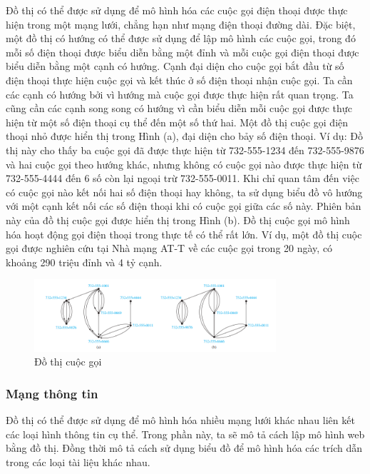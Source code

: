 Đồ thị có thể được sử dụng để mô hình hóa các cuộc gọi điện thoại được thực hiện trong một mạng lưới, chẳng hạn như mạng điện thoại đường dài. Đặc biệt, một đồ thị có hướng có thể được sử dụng để lập mô hình các cuộc gọi, trong đó mỗi số điện thoại được biểu diễn bằng một đỉnh và mỗi cuộc gọi điện thoại được biểu diễn bằng một cạnh có hướng. Cạnh đại diện cho cuộc gọi bắt đầu từ số điện thoại thực hiện cuộc gọi và kết thúc ở số điện thoại nhận cuộc gọi. Ta cần các cạnh có hướng bởi vì hướng mà cuộc gọi được thực hiện rất quan trọng. Ta cũng cần các cạnh song song có hướng vì cần biểu diễn mỗi cuộc gọi được thực hiện từ một số điện thoại cụ thể đến một số thứ hai.
Một đồ thị cuộc gọi điện thoại nhỏ được hiển thị trong Hình (a), đại diện cho bảy số điện thoại. Ví dụ: Đồ thị này cho thấy ba cuộc gọi đã được thực hiện từ 732-555-1234 đến 732-555-9876 và hai cuộc gọi theo hướng khác, nhưng không có cuộc gọi nào được thực hiện từ 732-555-4444 đến 6 số còn lại ngoại trừ 732-555-0011. Khi chỉ quan tâm đến việc có cuộc gọi nào kết nối hai số điện thoại hay không, ta sử dụng biểu đồ vô hướng với một cạnh kết nối các số điện thoại khi có cuộc gọi giữa các số này. Phiên bản này của đồ thị cuộc gọi được hiển thị trong Hình (b).
Đồ thị cuộc gọi mô hình hóa hoạt động gọi điện thoại trong thực tế có thể rất lớn. Ví dụ, một đồ thị cuộc gọi được nghiên cứu tại Nhà mạng AT-T về các cuộc gọi trong 20 ngày, có khoảng 290 triệu đỉnh và 4 tỷ cạnh.

\begin{figure}[H] %
    \centering %
    \includegraphics[width=0.8\textwidth]{assets/pic8.png} 
    \caption{Đồ thị cuộc gọi} %
\end{figure}


\subsubsection{Mạng thông tin}
Đồ thị có thể được sử dụng để mô hình hóa nhiều mạng lưới khác nhau liên kết các loại hình thông tin cụ thể. Trong phần này, ta sẽ mô tả cách lập mô hình web bằng đồ thị. Đồng thời mô tả cách sử dụng biểu đồ để mô hình hóa các trích dẫn trong các loại tài liệu khác nhau.

